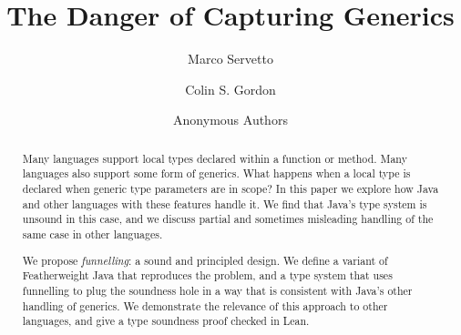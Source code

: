 \documentclass[a4paper,UKenglish,cleveref, autoref, thm-restate]{lipics-v2021}
\author{Marco Servetto}{School of Engineering and Computer Science, Victoria University of Wellington, New Zealand}{marco.servetto@vuw.ac.nz}{https://orcid.org/0000-0003-1458-2868}{}%
\author{Colin S. Gordon}{School of Computer \& Information Sciences, Drexel University, United States of America}{csgordon@drexel.edu}{https://orcid.org/0000-0002-9012-4490}{} %
\author{Anonymous Authors}{Somewhere}{}{}{}
\title{The Danger of Capturing Generics}
\begin{document}
\maketitle

\begin{abstract}
Many languages support local types declared within a function or method.
Many languages also support some form of generics.
What happens when a local type is declared when generic type parameters are in scope?
In this paper we explore how Java and other languages with these features handle it.
We find that Java's type system is unsound in this case, and we discuss partial and sometimes misleading handling of the same case in other languages.

We propose \emph{funnelling}: a sound and principled design.
We define a variant of Featherweight Java that reproduces the problem, and a type system that uses funnelling to plug the soundness hole in a way that is consistent with Java's other handling of generics.
We demonstrate the relevance of this approach to other languages, and give a type soundness proof checked in Lean.
\end{abstract}










\appendix


\end{document}
